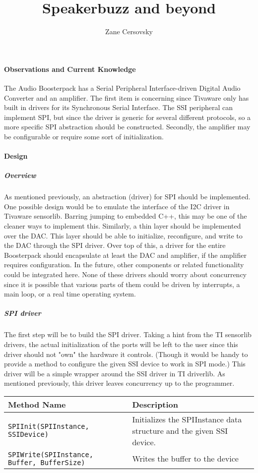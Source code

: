 \documentclass{article}
\title{Speakerbuzz and beyond}
\author{Zane Cersovsky}
\begin{document}
\maketitle
\paragraph{Observations and Current Knowledge}

The Audio Boosterpack has a Serial Peripheral Interface-driven Digital Audio Converter and an amplifier.
The first item is concerning since Tivaware only has built in drivers for its Synchronous Serial Interface.
The SSI peripheral can implement SPI, but since the driver is generic for several different protocols, so 
a more specific SPI abstraction should be constructed. Secondly, the amplifier may be configurable or require
some sort of initialization.

\paragraph{Design}
\subparagraph{Overview}
As mentioned previously, an abstraction (driver) for SPI should be implemented. One possible design 
would be to emulate the interface of the I2C driver in Tivaware sensorlib. Barring jumping to embedded C++,
this may be one of the cleaner ways to implement this. Similarly, a thin layer should be implemented over 
the DAC. This layer should be able to initialize, reconfigure, and write to the DAC through the SPI driver. 
Over top of this, a driver for the entire Boosterpack should encapsulate at least the DAC and amplifier, if 
the amplifier requires configuration. In the future, other components or related functionality could be 
integrated here. None of these drivers should worry about concurrency since it is possible that various 
parts of them could be driven by interrupts, a main loop, or a real time operating system.

\subparagraph{SPI driver}
The first step will be to build the SPI driver. Taking a hint from the TI sensorlib drivers, the actual initialization
of the ports will be left to the user since this driver should not "own" the hardware it controls. (Though it would be 
handy to provide a method to configure the given SSI device to work in SPI mode.) This driver will be a simple wrapper 
around the SSI driver in TI driverlib. As mentioned previously, this driver leaves concurrency up to the programmer. \\

\begin{tabularx}{\linewidth}{| X | X |}
    \hline
    Method Name & Description \\
    \hline
    \texttt{SPIInit(SPIInstance, SSIDevice)} & Initializes the SPIInstance data structure and the given SSI device. \\
    \texttt{SPIWrite(SPIInstance, Buffer, BufferSize)} & Writes the buffer to the device \\
    \hline
\end{tabularx}
\end{document}
